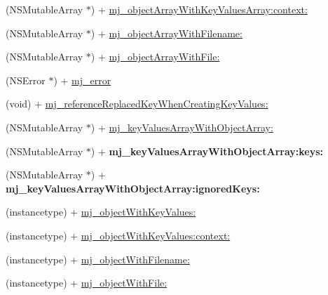 \begin{DoxyCompactItemize}
\item 
(N\+S\+Mutable\+Array $\ast$) + \mbox{\hyperlink{category_n_s_object_07_m_j_key_value_08_a38ad57bdfe18e6432c8dc94569c3be7d}{mj\+\_\+object\+Array\+With\+Key\+Values\+Array\+:context\+:}}
\item 
(N\+S\+Mutable\+Array $\ast$) + \mbox{\hyperlink{category_n_s_object_07_m_j_key_value_08_a6e179d7da5def0fe40427b4982a68591}{mj\+\_\+object\+Array\+With\+Filename\+:}}
\item 
(N\+S\+Mutable\+Array $\ast$) + \mbox{\hyperlink{category_n_s_object_07_m_j_key_value_08_ac15e292cdd35db5aae0215cea1e4ff7e}{mj\+\_\+object\+Array\+With\+File\+:}}
\item 
(N\+S\+Error $\ast$) + \mbox{\hyperlink{category_n_s_object_07_m_j_key_value_08_ab6e5a0c2a22f66eda49c4d13327f7607}{mj\+\_\+error}}
\item 
(void) + \mbox{\hyperlink{category_n_s_object_07_m_j_key_value_08_a5ef85ce0a227c02af06d33051a0d77cb}{mj\+\_\+reference\+Replaced\+Key\+When\+Creating\+Key\+Values\+:}}
\item 
(N\+S\+Mutable\+Array $\ast$) + \mbox{\hyperlink{category_n_s_object_07_m_j_key_value_08_ab839459f5ea5711e5c030130431db942}{mj\+\_\+key\+Values\+Array\+With\+Object\+Array\+:}}
\item 
\mbox{\label{category_n_s_object_07_m_j_key_value_08_af594c7b37a1b2c8eb47842f09e61f449}} 
(N\+S\+Mutable\+Array $\ast$) + {\bfseries mj\+\_\+key\+Values\+Array\+With\+Object\+Array\+:keys\+:}
\item 
\mbox{\label{category_n_s_object_07_m_j_key_value_08_a0dfaed3d6d91f165b666058e551dcff6}} 
(N\+S\+Mutable\+Array $\ast$) + {\bfseries mj\+\_\+key\+Values\+Array\+With\+Object\+Array\+:ignored\+Keys\+:}
\item 
(instancetype) + \mbox{\hyperlink{category_n_s_object_07_m_j_key_value_08_a8620ab8d9fd3e832d4f8de504f49724d}{mj\+\_\+object\+With\+Key\+Values\+:}}
\item 
(instancetype) + \mbox{\hyperlink{category_n_s_object_07_m_j_key_value_08_aac86cc29566e0ff89cadb66d79a61db8}{mj\+\_\+object\+With\+Key\+Values\+:context\+:}}
\item 
(instancetype) + \mbox{\hyperlink{category_n_s_object_07_m_j_key_value_08_a44d9d52cc68ef8c354e28ddc5973aecb}{mj\+\_\+object\+With\+Filename\+:}}
\item 
(instancetype) + \mbox{\hyperlink{category_n_s_object_07_m_j_key_value_08_a98ff8a880e1de766fe702c800c1ec70d}{mj\+\_\+object\+With\+File\+:}}

\end{DoxyCompactItemize}
